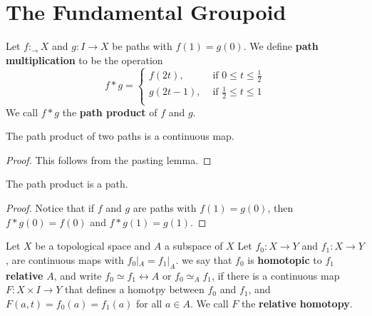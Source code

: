 
\section{The Fundamental Groupoid}

\begin{definition}
    Let $f:_ \xrightarrow{} X$ and $g:I \xrightarrow{} X$ be paths with
    $f(1)=g(0)$. We define \textbf{path multiplication} to be the operation
    \begin{equation*}
       f \ast g= \begin{cases}
                   f(2t), & \text{ if } 0 \leq t \leq \frac{1}{2}   \\
                   g(2t-1), & \text{ if } \frac{1}{2} \leq t \leq 1   \\
              \end{cases}
    \end{equation*}
    We call $f \ast g$ the  \textbf{path product} of $f$ and  $g$.
\end{definition}

\begin{lemma}\label{4.1.1}
    The path product of two paths is a continuous map.
\end{lemma}
\begin{proof}
    This follows from the pasting lemma.
\end{proof}
\begin{corollary}
    The path product is a path.
\end{corollary}
\begin{proof}
    Notice that if $f$ and  $g$ are paths with  $f(1)=g(0)$, then $f \ast
    g(0)=f(0)$ and $f \ast g(1)=g(1)$.
\end{proof}

\begin{definition}
    Let $X$ be a topological space and $A$ a subspace of $X$ Let $f_0:X
    \xrightarrow{} Y$ and $f_1:X \xrightarrow{} Y$, are continuous maps with
    $f_0|_A=f_1|_A$. we say that $f_0$ is \textbf{homotopic} to $f_1$
    \textbf{relative} $A$, and write $f_0 \simeq f_1 \rel{A}$ or $f_0 \simeq_A
    f_1$, if there is a continuous map $F:X \times I \xrightarrow{} Y$ that
    defines a homotpy between $f_0$ and $f_1$, and $F(a,t)=f_0(a)=f_1(a)$ for
    all $a \in A$. We call $F$ the \textbf{relative homotopy}.
\end{definition}

